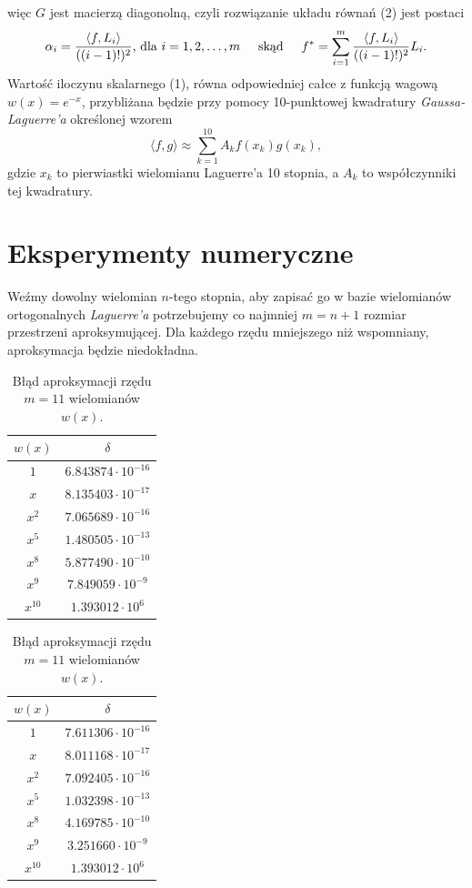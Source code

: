 \documentclass[a4paper,12pt]{article}
\begin{document}
więc $G$ jest macierzą diagonolną, czyli rozwiązanie układu równań (2) jest postaci
\begin{equation*}
    \alpha_i = \frac{\langle f, L_i \rangle}{((i-1)!)^2} 
    \text{, dla } i = 1,2,\hdots,m
    \hspace{0.5cm}
    \text{skąd}
    \hspace{0.5cm}
    f^* = \sum^m_{i=1} \frac{\langle f, L_i \rangle}{((i-1)!)^2}L_i.
\end{equation*}
Wartość iloczynu skalarnego (1), równa odpowiedniej całce z funkcją wagową $w(x) = e^{-x}$, przybliżana będzie przy pomocy 10-punktowej kwadratury \textit{Gaussa-Laguerre'a} określonej wzorem
\begin{equation}
    \langle f,g \rangle \approx \sum^{10}_{k=1} A_kf(x_k)g(x_k),
\end{equation}
gdzie $x_k$ to pierwiastki wielomianu Laguerre'a 10 stopnia, a $A_k$ to współczynniki tej kwadratury.
\section*{Eksperymenty numeryczne}
Weźmy dowolny wielomian $n$-tego stopnia, aby zapisać go w bazie wielomianów ortogonalnych \textit{Laguerre'a} potrzebujemy co najmniej $m = n + 1$ rozmiar przestrzeni aproksymującej. 
Dla każdego rzędu mniejszego niż wspomniany, aproksymacja będzie niedokładna. 

\begin{table}
\begin{tabular}{|c|c|}
\hline
$w(x)$   & $\delta$       \\ \hline
$1$      & $6.843874\cdot 10^{-16}$ \\
$x$      & $8.135403\cdot 10^{-17}$ \\
$x^2$    & $7.065689\cdot 10^{-16}$ \\
$x^5$    & $1.480505\cdot 10^{-13}$ \\
$x^8$    & $5.877490\cdot 10^{-10}$ \\
$x^9$    & $7.849059\cdot 10^{-9}$ \\
$x^{10}$ & $1.393012\cdot 10^{6}$ \\ \hline
\end{tabular}
\caption{Błąd aproksymacji rzędu $m = 10$ wielomianów $w(x)$.}
\hspace{2cm}
\begin{tabular}{|c|c|}
\hline
$w(x)$   & $\delta$                 \\ \hline
$1$      & $7.611306\cdot 10^{-16}$ \\
$x$      & $8.011168\cdot 10^{-17}$ \\
$x^2$    & $7.092405\cdot 10^{-16}$ \\
$x^5$    & $1.032398\cdot 10^{-13}$ \\
$x^8$    & $4.169785\cdot 10^{-10}$ \\
$x^9$    & $3.251660\cdot 10^{-9}$  \\
$x^{10}$ & $1.393012\cdot 10^{6}$   \\ \hline
\end{tabular}
\caption{Błąd aproksymacji rzędu $m = 11$ wielomianów $w(x)$.}
\vspace{0.4cm}
\end{table}
\end{document}
